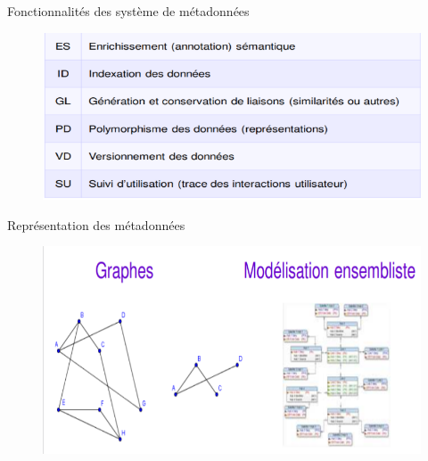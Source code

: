 \begin{frame}{Fonctionnalités des système de métadonnées}
    \begin{figure}
        \centering
        \includegraphics[scale=0.6]{figures/fonctionalite.PNG}
    \end{figure}
\end{frame}

\begin{frame}{Représentation des métadonnées}
   \begin{figure}
       \centering
       \includegraphics[scale=0.5]{figures/representation2.PNG}
   \end{figure} 
\end{frame}

